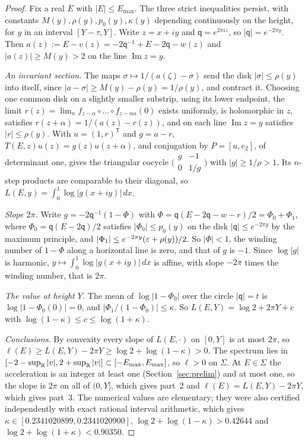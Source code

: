 \begin{proof}
Fix a real $E$ with $|E|\le E_{\max}$. The three strict inequalities persist, with constants $M(y),\rho(y),p_0(y),\kappa(y)$ depending continuously on the height, for $y$ in an interval $[Y-\tau,Y]$. Write $z=x+iy$ and $\mathsf q=e^{2\pi iz}$, so $|\mathsf q|=e^{-2\pi y}$. Then $a(z):=E-v(z)=-2\mathsf q^{-1}+E-2\mathsf q-w(z)$ and $|a(z)|\ge M(y)>2$ on the line $\operatorname{Im}z=y$.

\emph{An invariant section.} The maps $\sigma\mapsto1/(a(\zeta)-\sigma)$ send the disk $|\sigma|\le\rho(y)$ into itself, since $|a-\sigma|\ge M(y)-\rho(y)=1/\rho(y)$, and contract it. Choosing one common disk on a slightly smaller substrip, using its lower endpoint, the limit $r(z)=\lim_n f_{z-\alpha}\circ\dots\circ f_{z-n\alpha}(0)$ exists uniformly, is holomorphic in $z$, satisfies $r(z+\alpha)=1/(a(z)-r(z))$, and on each line $\operatorname{Im}z=y$ satisfies $|r|\le\rho(y)$. With $u=(1,r)^{\mathsf T}$ and $g=a-r$, $T(E,z)u(z)=g(z)u(z+\alpha)$, and conjugation by $P=[u,e_2]$, of determinant one, gives the triangular cocycle $\bigl(\begin{smallmatrix}g&-1\\0&1/g\end{smallmatrix}\bigr)$ with $|g|\ge1/\rho>1$. Its $n$-step products are comparable to their diagonal, so $L(E,y)=\int_0^1\log|g(x+iy)|\,dx$.

\emph{Slope $2\pi$.} Write $g=-2\mathsf q^{-1}(1-\Phi)$ with $\Phi=\mathsf q(E-2\mathsf q-w-r)/2=\Phi_0+\Phi_1$, where $\Phi_0=\mathsf q(E-2\mathsf q)/2$ satisfies $|\Phi_0|\le p_0(y)$ on the disk $|\mathsf q|\le e^{-2\pi y}$ by the maximum principle, and $|\Phi_1|\le e^{-2\pi y}(\varepsilon+\rho(y))/2$. So $|\Phi|<1$, the winding number of $1-\Phi$ along a horizontal line is zero, and that of $g$ is $-1$. Since $\log|g|$ is harmonic, $y\mapsto\int_0^1\log|g(x+iy)|\,dx$ is affine, with slope $-2\pi$ times the winding number, that is $2\pi$.

\emph{The value at height $Y$.} The mean of $\log|1-\Phi_0|$ over the circle $|\mathsf q|=t$ is $\log|1-\Phi_0(0)|=0$, and $|\Phi_1/(1-\Phi_0)|\le\kappa$. So $L(E,Y)=\log2+2\pi Y+c$ with $\log(1-\kappa)\le c\le\log(1+\kappa)$.

\emph{Conclusions.} By convexity every slope of $L(E,\cdot)$ on $[0,Y]$ is at most $2\pi$, so $\ell(E)\ge L(E,Y)-2\pi Y\ge\log2+\log(1-\kappa)>0$. The spectrum lies in $[-2-\sup_\mathbb R|v|,2+\sup_\mathbb R|v|]\subset[-E_{\max},E_{\max}]$, so $\ell>0$ on $\Sigma$. At $E\in\Sigma$ the acceleration is an integer at least one (Section~\ref{sec:prelim}) and at most one, so the slope is $2\pi$ on all of $(0,Y]$, which gives part~2 and $\ell(E)=L(E,Y)-2\pi Y$, which gives part~3. The numerical values are elementary; they were also certified independently with exact rational interval arithmetic, which gives $\kappa\in[0.2341020899,0.2341020900]$, $\log2+\log(1-\kappa)>0.42644$ and $\log2+\log(1+\kappa)<0.90350$.
\end{proof}

